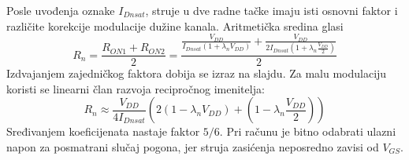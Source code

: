 Posle uvođenja oznake $I_{Dnsat}$, struje u dve radne tačke imaju isti osnovni faktor i različite korekcije modulacije dužine kanala. Aritmetička sredina glasi
\[R_n=\frac{R_{ON1}+R_{ON2}}2=\frac{\frac{V_{DD}}{I_{Dnsat}(1+\lambda_nV_{DD})}+\frac{V_{DD}}{2I_{Dnsat}(1+\lambda_n\frac{V_{DD}}2)}}2\]
Izdvajanjem zajedničkog faktora dobija se izraz na slajdu. Za malu modulaciju koristi se linearni član razvoja recipročnog imenitelja:
\[R_n\approx\frac{V_{DD}}{4I_{Dnsat}}\left(2(1-\lambda_nV_{DD})+\left(1-\lambda_n\frac{V_{DD}}2\right)\right)\]
Sređivanjem koeficijenata nastaje faktor $5/6$. Pri računu je bitno odabrati ulazni napon za posmatrani slučaj pogona, jer struja zasićenja neposredno zavisi od $V_{GS}$.
